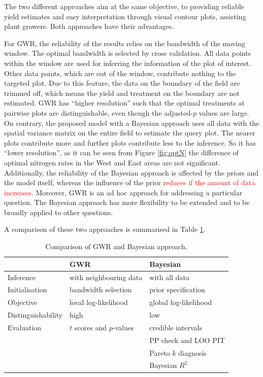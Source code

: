 \documentclass[a4paper]{article}   	%
\begin{document}
	The two different approaches aim at the same objective, to providing reliable yield estimates and easy interpretation through visual contour plots, assisting plant growers. Both approaches have their advantages. 
	
	For GWR, the reliability of the results relies on the bandwidth of the moving window. The optimal bandwidth is selected by cross validation. All data points within the window are used for inferring the information of the plot of interest. Other data points, which are out of the window, contribute nothing to the targeted plot. Due to this feature, the data on the boundary of the field are trimmed off, which means the yield and treatment on the boundary are not estimated. GWR has ``higher resolution'' such that the optimal treatments at pairwise plots are distinguishable, even though the adjusted-$p$ values are large. On contrary, the proposed model with a Bayesian approach uses all data with the spatial variance matrix on the entire field to estimate the query plot. The nearer plots contribute more and further plots contribute less to the inference. So it has ``lower resolution'', as it can be seen from Figure \ref{fig:optN} the difference of optimal nitrogen rates in the West and East areas are not significant. Additionally, the reliability of the Bayesian approach is affected by the priors and the model itself, whereas the influence of the prior \textcolor{red}{reduces if the amount of data increases}. Moreover, GWR is an ad hoc approach for addressing a particular question. The Bayesian approach has more flexibility to be extended and to be broadly applied to other questions. 
	
	
	A comparison of these two approaches is summarised in Table \ref{tb:compareGWR}. 
	\begin{table}[!htp]
		\centering
		\begin{tabular}{*{3}{l}} \toprule
			& GWR & Bayesian \\ \midrule
			Inference	& with neighbouring data & with all data \\ 	 
			Initialisation	& bandwidth selection &  prior specification \\ 	
			Objective	& local log-likelihood & global log-likelihood \\ 
			Distinguishability & high & low \\ \midrule
			Evaluation	&  $t$ scores and $p$-values & credible intervals \\
			&  & PP check and LOO PIT \\
			&  & Pareto $k$ diagnosis \\
			&  & Bayesian $R^2$ \\ 
			\bottomrule
		\end{tabular}
		\caption{Comparison of GWR and Bayesian approach.}\label{tb:compareGWR}
	\end{table}
	
\end{document}
